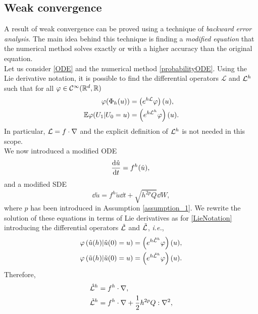\subsection{Weak convergence}

A result of weak convergence can be proved using a technique of \textit{backward error analysis}. The main idea behind this technique is finding a \textit{modified equation} that the numerical method solves exactly or with a higher accuracy than the original equation. \\
Let us consider \eqref{ODE} and the numerical method \eqref{probabilityODE}. Using the Lie derivative notation, it is possible to find the differential operators $\mathcal{L}$ and $\mathcal{L}^h$ such that for all $\varphi \in \mathcal{C}^\infty(\mathbb{R}^d, \mathbb{R})$ 
\begin{equation}\label{LieNotation}
\begin{aligned}
	\varphi(\Phi_h(u)) &= \left(e^{h\mathcal{L}} \varphi\right)(u), \\
	\mathbb{E}\varphi(U_1 | U_0 = u) &= \left(e^{h\mathcal{L}^h}\varphi\right)(u).
\end{aligned}
\end{equation}
In particular, $\mathcal{L} = f \cdot \nabla$ and the explicit definition of $\mathcal{L}^h$ is not needed in this scope. \\
We now introduced a modified ODE
\begin{equation}\label{modifiedODE}
	\dv{\hat u}{t} = f^h(\hat u), \\
\end{equation}
and a modified SDE
\begin{equation}\label{modifiedSDE}
	\dd{\tilde u} = f^h{\tilde u}\dd{t} + \sqrt{h^{2p} Q} \dd{W},
\end{equation}
where $p$ has been introduced in Assumption \ref{assumption_1}. We rewrite the solution of these equations in terms of Lie derivatives as for \eqref{LieNotation} introducing the differential operators $\hat {\mathcal{L}}$ and $\tilde {\mathcal{L}}$, \textit{i.e.},
\begin{equation}\label{LieNotationModif}
\begin{aligned}
	\varphi\left(\hat u(h) | \hat u(0) = u\right) &= \left(e^{h\hat{\mathcal{L}}^h}\varphi\right)(u), \\
	\varphi\left(\tilde u(h)|\tilde u(0) = u\right) &= \left(e^{h\tilde{\mathcal{L}}^h}\varphi\right)(u).
\end{aligned}
\end{equation}
Therefore,
\begin{equation}
\begin{aligned}
	\hat {\mathcal{L}}^h &= f^h \cdot \nabla, \\
	\tilde {\mathcal{L}}^h &= f^h \cdot \nabla + \frac{1}{2} h^{2p} Q : \nabla^2,
\end{aligned}
\end{equation}
